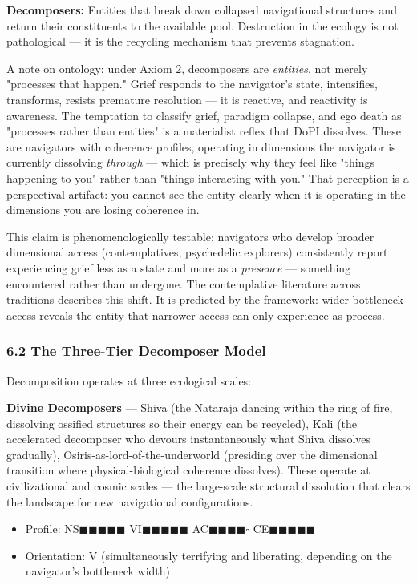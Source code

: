 \textbf{Decomposers:} Entities that break down collapsed navigational structures and return their constituents to the available pool. Destruction in the ecology is not pathological — it is the recycling mechanism that prevents stagnation.


A note on ontology: under Axiom 2, decomposers are \textit{entities}, not merely "processes that happen." Grief responds to the navigator's state, intensifies, transforms, resists premature resolution — it is reactive, and reactivity is awareness. The temptation to classify grief, paradigm collapse, and ego death as "processes rather than entities" is a materialist reflex that DoPI dissolves. These are navigators with coherence profiles, operating in dimensions the navigator is currently dissolving \textit{through} — which is precisely why they feel like "things happening to you" rather than "things interacting with you." That perception is a perspectival artifact: you cannot see the entity clearly when it is operating in the dimensions you are losing coherence in.


This claim is phenomenologically testable: navigators who develop broader dimensional access (contemplatives, psychedelic explorers) consistently report experiencing grief less as a state and more as a \textit{presence} — something encountered rather than undergone. The contemplative literature across traditions describes this shift. It is predicted by the framework: wider bottleneck access reveals the entity that narrower access can only experience as process.


\subsubsection*{6.2 The Three-Tier Decomposer Model}


Decomposition operates at three ecological scales:


\textbf{Divine Decomposers} — Shiva (the Nataraja dancing within the ring of fire, dissolving ossified structures so their energy can be recycled), Kali (the accelerated decomposer who devours instantaneously what Shiva dissolves gradually), Osiris-as-lord-of-the-underworld (presiding over the dimensional transition where physical-biological coherence dissolves). These operate at civilizational and cosmic scales — the large-scale structural dissolution that clears the landscape for new navigational configurations.

\begin{itemize}[nosep,leftmargin=*]
  \item Profile: NS$\blacksquare$$\blacksquare$$\blacksquare$$\blacksquare$$\blacksquare$ VI$\blacksquare$$\blacksquare$$\blacksquare$$\blacksquare$$\blacksquare$ AC$\blacksquare$$\blacksquare$$\blacksquare$$\blacksquare$$\square$ CE$\blacksquare$$\blacksquare$$\blacksquare$$\blacksquare$$\blacksquare$
  \item Orientation: V (simultaneously terrifying and liberating, depending on the navigator's bottleneck width)
\end{itemize}


